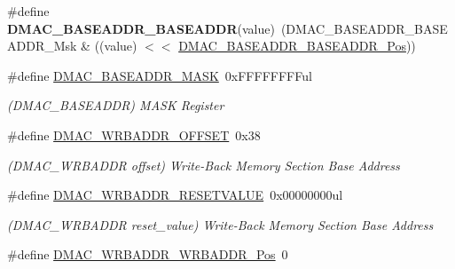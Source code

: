 \begin{DoxyCompactItemize}
\item 
\hypertarget{group___s_a_m_l21___d_m_a_c_ga763e8b45be532797a278a6008d7439c2}{}\#define {\bfseries D\+M\+A\+C\+\_\+\+B\+A\+S\+E\+A\+D\+D\+R\+\_\+\+B\+A\+S\+E\+A\+D\+D\+R}(value)~(D\+M\+A\+C\+\_\+\+B\+A\+S\+E\+A\+D\+D\+R\+\_\+\+B\+A\+S\+E\+A\+D\+D\+R\+\_\+\+Msk \& ((value) $<$$<$ \hyperlink{group___s_a_m_l21___d_m_a_c_ga0374f88f6164b4a8f3a1cb907ca86245}{D\+M\+A\+C\+\_\+\+B\+A\+S\+E\+A\+D\+D\+R\+\_\+\+B\+A\+S\+E\+A\+D\+D\+R\+\_\+\+Pos}))\label{group___s_a_m_l21___d_m_a_c_ga763e8b45be532797a278a6008d7439c2}

\item 
\hypertarget{group___s_a_m_l21___d_m_a_c_ga127ef226f77026d0823b747ee67bae23}{}\#define \hyperlink{group___s_a_m_l21___d_m_a_c_ga127ef226f77026d0823b747ee67bae23}{D\+M\+A\+C\+\_\+\+B\+A\+S\+E\+A\+D\+D\+R\+\_\+\+M\+A\+S\+K}~0x\+F\+F\+F\+F\+F\+F\+F\+Ful\label{group___s_a_m_l21___d_m_a_c_ga127ef226f77026d0823b747ee67bae23}

\begin{DoxyCompactList}\small\item\em (D\+M\+A\+C\+\_\+\+B\+A\+S\+E\+A\+D\+D\+R) M\+A\+S\+K Register \end{DoxyCompactList}\item 
\hypertarget{group___s_a_m_l21___d_m_a_c_ga5b6aaec44da69cd41c7d06d89f0efe09}{}\#define \hyperlink{group___s_a_m_l21___d_m_a_c_ga5b6aaec44da69cd41c7d06d89f0efe09}{D\+M\+A\+C\+\_\+\+W\+R\+B\+A\+D\+D\+R\+\_\+\+O\+F\+F\+S\+E\+T}~0x38\label{group___s_a_m_l21___d_m_a_c_ga5b6aaec44da69cd41c7d06d89f0efe09}

\begin{DoxyCompactList}\small\item\em (D\+M\+A\+C\+\_\+\+W\+R\+B\+A\+D\+D\+R offset) Write-\/\+Back Memory Section Base Address \end{DoxyCompactList}\item 
\hypertarget{group___s_a_m_l21___d_m_a_c_ga189f4aeb04740867b54f1aa1e6f1ddb8}{}\#define \hyperlink{group___s_a_m_l21___d_m_a_c_ga189f4aeb04740867b54f1aa1e6f1ddb8}{D\+M\+A\+C\+\_\+\+W\+R\+B\+A\+D\+D\+R\+\_\+\+R\+E\+S\+E\+T\+V\+A\+L\+U\+E}~0x00000000ul\label{group___s_a_m_l21___d_m_a_c_ga189f4aeb04740867b54f1aa1e6f1ddb8}

\begin{DoxyCompactList}\small\item\em (D\+M\+A\+C\+\_\+\+W\+R\+B\+A\+D\+D\+R reset\+\_\+value) Write-\/\+Back Memory Section Base Address \end{DoxyCompactList}\item 
\hypertarget{group___s_a_m_l21___d_m_a_c_ga2521a42f3dbcfca0ef2f94888d5f035f}{}\#define \hyperlink{group___s_a_m_l21___d_m_a_c_ga2521a42f3dbcfca0ef2f94888d5f035f}{D\+M\+A\+C\+\_\+\+W\+R\+B\+A\+D\+D\+R\+\_\+\+W\+R\+B\+A\+D\+D\+R\+\_\+\+Pos}~0\label{group___s_a_m_l21___d_m_a_c_ga2521a42f3dbcfca0ef2f94888d5f035f}


\end{DoxyCompactItemize}
